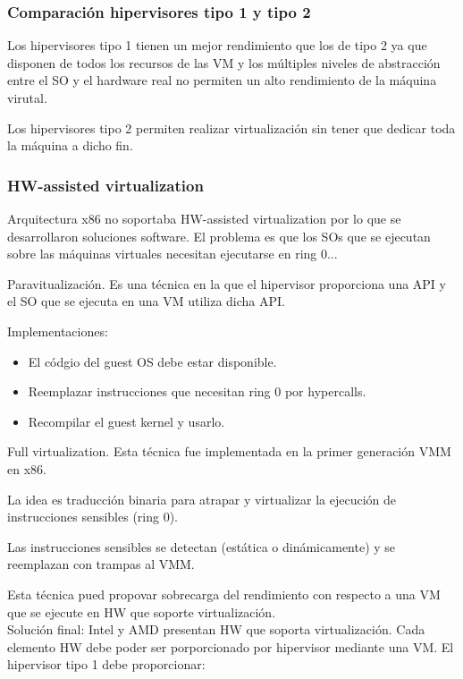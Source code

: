 \documentclass{article}
\begin{document}
		\subsubsection{Comparación hipervisores tipo 1 y tipo 2}
			Los hipervisores tipo 1 tienen un mejor rendimiento que los de tipo 2 ya que disponen de todos los recursos de las VM y los múltiples niveles de abstracción entre el SO y el hardware real no permiten un alto rendimiento de la máquina virutal.
			
			Los hipervisores tipo 2 permiten realizar virtualización sin tener que dedicar toda la máquina a dicho fin.
			
		\subsubsection{HW-assisted virtualization}
			Arquitectura x86 no soportaba HW-assisted virtualization por lo que se desarrollaron soluciones software. El problema es que los SOs que se ejecutan sobre las máquinas virtuales necesitan ejecutarse en ring 0...
			
			Paravitualización. Es una técnica en la que el hipervisor proporciona una API y el SO que se ejecuta en una VM utiliza dicha API.
			
			Implementaciones: \\
			
				\begin{itemize}
				\item El códgio del guest OS debe estar disponible.
				\item Reemplazar instrucciones que necesitan ring 0 por hypercalls.
				\item Recompilar el guest kernel y usarlo.
				\end{itemize}
			
			Full virtualization. Esta técnica fue implementada en la primer generación VMM en x86.
			
			La idea es traducción binaria para atrapar y virtualizar la ejecución de instrucciones sensibles (ring 0).
			
			Las instrucciones sensibles se detectan (estática o dinámicamente) y se reemplazan con trampas al VMM.
			
			Esta técnica pued propovar sobrecarga del rendimiento con respecto a una VM que se ejecute en HW que soporte virtualización. \\
			
			Solución final: Intel y AMD presentan HW que soporta virtualización. Cada elemento HW debe poder ser porporcionado por hipervisor mediante una VM. El hipervisor tipo 1 debe proporcionar:
			
\end{document}
